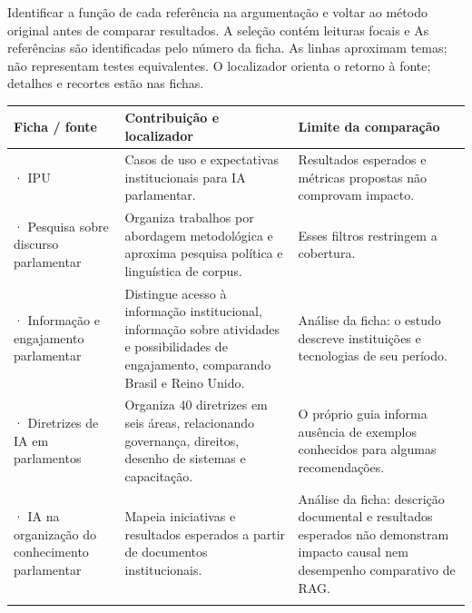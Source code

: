Identificar a função de cada referência na argumentação e voltar ao método original antes de comparar resultados. A seleção contém leituras focais e
\clearpage
{}
As referências são identificadas pelo número da ficha. As linhas aproximam temas; não representam testes equivalentes. O localizador orienta o retorno à fonte; detalhes e recortes estão nas fichas.

{\small\renewcommand{\arraystretch}{1.3}
\begin{tabularx}{\textwidth}{@{}>{\raggedright\arraybackslash}p{29mm}>{\raggedright\arraybackslash}X>{\raggedright\arraybackslash}X@{}}
\toprule
\textbf{Ficha / fonte} & \textbf{Contribuição e localizador} & \textbf{Limite da comparação}\\
\midrule
03 · IPU & Casos de uso e expectativas institucionais para IA parlamentar.\par\smallskip{\footnotesize Introdução; caso 024} & Resultados esperados e métricas propostas não comprovam impacto.\\
\addlinespace[5pt]
12 · Pesquisa sobre discurso parlamentar & Organiza trabalhos por abordagem metodológica e aproxima pesquisa política e linguística de corpus.\par\smallskip{\footnotesize seção 3.1, p. 2} & Esses filtros restringem a cobertura.\\
\addlinespace[5pt]
14 · Informação e engajamento parlamentar & Distingue acesso à informação institucional, informação sobre atividades e possibilidades de engajamento, comparando Brasil e Reino Unido.\par\smallskip{\footnotesize Resumo} & Análise da ficha: o estudo descreve instituições e tecnologias de seu período.\\
\addlinespace[5pt]
19 · Diretrizes de IA em parlamentos & Organiza 40 diretrizes em seis áreas, relacionando governança, direitos, desenho de sistemas e capacitação.\par\smallskip{\footnotesize Diretriz 5.7} & O próprio guia informa ausência de exemplos conhecidos para algumas recomendações.\\
\addlinespace[5pt]
45 · IA na organização do conhecimento parlamentar & Mapeia iniciativas e resultados esperados a partir de documentos institucionais.\par\smallskip{\footnotesize Seção 2} & Análise da ficha: descrição documental e resultados esperados não demonstram impacto causal nem desempenho comparativo de RAG.\\
\addlinespace[5pt]
\bottomrule
\end{tabularx}}

